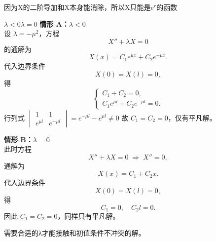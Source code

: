 \begin{dxtips}
    因为X的二阶导加和X本身能消除，所以X只能是$e^r$的函数
\end{dxtips}
\begin{compare}{\(\lambda < 0\)}{\(\lambda = 0\)}
\textbf{情形 A：\(\lambda < 0\)}\\[3pt]
设 \(\lambda = -\mu^2\)，方程
\[
X'' + \lambda X = 0
\]
的通解为
\[
X(x) = C_1 e^{\mu x} + C_2 e^{-\mu x}.
\]
代入边界条件
\[
X(0) = X(l) = 0,
\]
得
\[
\begin{cases}
C_1 + C_2 = 0,\\[2pt]
C_1 e^{\mu l} + C_2 e^{-\mu l} = 0.
\end{cases}
\]
行列式
\(
\begin{vmatrix}
1 & 1\\ e^{\mu l} & e^{-\mu l}
\end{vmatrix}
= e^{-\mu l} - e^{\mu l} \neq 0
\)
故 \(C_1 = C_2 = 0\)，仅有平凡解。  

\tcblower

\textbf{情形 B：\(\lambda = 0\)}\\[3pt]
此时方程
\[
X'' + \lambda X = 0 \;\Rightarrow\; X'' = 0,
\]
通解为
\[
X(x) = C_1 + C_2 x.
\]
代入边界条件
\[
X(0) = X(l) = 0,
\]
得
\[
C_1 = 0, \quad C_2 l = 0.
\]
因此 \(C_1 = C_2 = 0\)，同样只有平凡解。
\end{compare}
\begin{dxtips}
    需要合适的λ才能接触和初值条件不冲突的解。
\end{dxtips}
